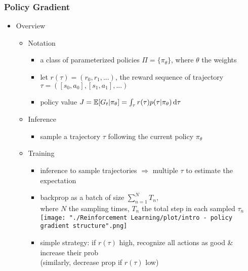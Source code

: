 \subsubsection{Policy Gradient}
\begin{itemize}
\item Overview
	\begin{itemize}
	\item Notation
		\begin{itemize}
		\item a class of parameterized policies $\Pi = \{ \pi_\theta \}$, where $\theta$ the weights
		\item let $r(\tau) = (r_0,r_1,...)$, the reward sequence of trajectory $\tau=([s_0,a_0], [s_1, a_1], ...)$
		\item policy value $J=\mathbb E [ G_t|\pi_\theta ] = \int_\tau r(\tau) p(\tau|\pi_\theta) \mathop{}\!\mathrm{d} \tau$
		\end{itemize}
	\item Inference
		\begin{itemize}
		\item sample a trajectory $\tau$ following the current policy $\pi_\theta$
		\end{itemize}
	\item Training
		\begin{itemize}
		\Item \begin{align*}\displaystyle \nabla_\theta J(\theta) &= \int_\tau r(\tau) \nabla_\theta p(\tau|\pi_\theta) \D\tau \\
		&= \int_\tau r(\tau) p(r|\pi_\theta) \nabla_\theta \log p(r|\pi_\theta)  \D\tau, \text{ as } \D y = y\frac{\D y}{y} = y\D (\log y) \\
		&= \mathbb E_{\tau\sim p(\tau|\pi_\theta)} \left[ r(\tau) \nabla_\theta p(\tau|\pi_\theta) \right]
		\end{align*}
		\item inference to sample trajectories $\Rightarrow$ multiple $\tau$ to estimate the expectation
		\item backprop as a batch of size $\sum_{n=1}^{N} T_n$, \\
		where $N$ the sampling times, $T_n$ the total step in each sampled $\tau_n$ \\
		\texttt{[image: "./Reinforcement Learning/plot/intro - policy gradient structure".png]}
		\item simple strategy: if $r(\tau)$ high, recognize all actions as good \& increase their prob \\
		(similarly, decrease prop if $r(\tau)$ low) \\

\end{itemize}
\end{itemize}
\end{itemize}
